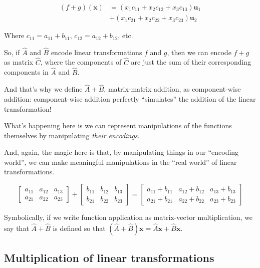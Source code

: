 \documentclass[]{article}
\begin{document}
\[
\begin{aligned}
(f + g)(\mathbf{x}) & = (x_1 c_{11} + x_2 c_{12} + x_3 c_{13}) \mathbf{u}_1 \\
                    & + (x_1 c_{21} + x_2 c_{22} + x_3 c_{23}) \mathbf{u}_2
\end{aligned}
\]

Where \(c_{11} = a_{11} + b_{11}\), \(c_{12} = a_{12} + b_{12}\), etc.

So, if \(\hat{A}\) and \(\hat{B}\) encode linear transformations \(f\) and
\(g\), then we can encode \(f + g\) as matrix \(\hat{C}\), where the components
of \(\hat{C}\) are just the sum of their corresponding components in \(\hat{A}\)
and \(\hat{B}\).

And that's why we define \(\hat{A} + \hat{B}\), matrix-matrix addition, as
component-wise addition: component-wise addition perfectly ``simulates'' the
addition of the linear transformation!

What's happening here is we can represent manipulations of the functions
themselves by manipulating \emph{their encodings}.

And, again, the magic here is that, by manipulating things in our ``encoding
world'', we can make meaningful manipulations in the ``real world'' of linear
transformations.

\[
\begin{bmatrix}
a_{11} & a_{12} & a_{13} \\
a_{21} & a_{22} & a_{23}
\end{bmatrix}
+
\begin{bmatrix}
b_{11} & b_{12} & b_{13} \\
b_{21} & b_{22} & b_{23}
\end{bmatrix}
=
\begin{bmatrix}
a_{11}+b_{11} & a_{12}+b_{12} & a_{13}+b_{13} \\
a_{21}+b_{21} & a_{22}+b_{22} & a_{23}+b_{23}
\end{bmatrix}
\]

Symbolically, if we write function application as matrix-vector multiplication,
we say that \(\hat{A} + \hat{B}\) is defined so that
\((\hat{A} + \hat{B})\mathbf{x} = \hat{A} \mathbf{x} + \hat{B} \mathbf{x}\).

\subsection{Multiplication of linear
transformations}\label{multiplication-of-linear-transformations}
\end{document}
